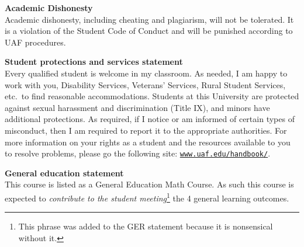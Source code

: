 \documentclass[12pt]{article}
\renewcommand{\emph}[1]{\textsf{\textbf{#1}}}
\newcommand{\localhead}[1]{\par\smallskip\textbf{#1} \smallskip\nobreak\\}%
\def\subheading#1{\localhead{\emph{#1}}}
\begin{document}
\subheading{Academic Dishonesty}
Academic dishonesty, including cheating and plagiarism, will not
be tolerated.  It is a violation of the Student Code of Conduct
and will be punished according to UAF procedures.


\subheading{Student protections and services statement}
Every qualified student is welcome in my classroom.  As needed, I am happy to work with you, Disability Services, Veterans' Services, Rural Student Services, etc.~to find reasonable accommodations.  Students at this University are protected against sexual harassment and discrimination (Title IX), and minors have additional protections.  As required, if I notice or am informed of certain types of misconduct, then I am required to report it to the appropriate authorities.  For more information on your rights as a student and the resources available to you to resolve problems, please go the following site: \href{https://www.uaf.edu/handbook/}{\texttt{www.uaf.edu/handbook/}}.


\subheading{General education statement}
This course is listed as a General Education Math Course.  As such this course is expected to \textsl{contribute to the student meeting}\footnote{This phrase was added to the GER statement because it is nonsensical without it.} the 4 general learning outcomes. 
\end{document}
